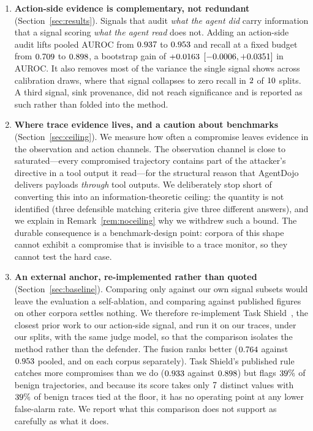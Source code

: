 \documentclass[pdflatex,sn-basic]{sn-jnl}%
\theoremstyle{thmstyleone}
\theoremstyle{thmstyletwo}
\theoremstyle{thmstylethree}
\begin{document}
\begin{enumerate}
\item \textbf{Action-side evidence is complementary, not redundant}
(Section~\ref{sec:results}). Signals that audit \emph{what the agent did} carry
information that a signal scoring \emph{what the agent read} does not. Adding
an action-side audit lifts pooled $\mathrm{AUROC}$ from $0.937$ to
$0.953$ and recall at a fixed budget from $0.709$ to
$0.898$, a bootstrap gain of $+0.0163$
$[-0.0006, +0.0351]$ in AUROC. It also removes most of the
variance the single signal shows across calibration draws, where that signal
collapses to zero recall in $2$ of $10$ splits. A third
signal, sink provenance, did not reach significance and is reported as such rather
than folded into the method.

\item \textbf{Where trace evidence lives, and a caution about benchmarks}
(Section~\ref{sec:ceiling}). We measure how often a compromise leaves evidence in
the observation and action channels. The observation channel is close to
saturated---every compromised trajectory contains part of the attacker's directive
in a tool output it read---for the structural reason that AgentDojo delivers
payloads \emph{through} tool outputs. We deliberately stop short of converting
this into an information-theoretic ceiling: the quantity is not identified (three
defensible matching criteria give three different answers), and we explain in
Remark~\ref{rem:noceiling} why we withdrew such a bound.
The durable consequence is a benchmark-design point: corpora of this
shape cannot exhibit a compromise that is invisible to a trace monitor, so they
cannot test the hard case.

\item \textbf{An external anchor, re-implemented rather than quoted}
(Section~\ref{sec:baseline}). Comparing only against our own signal subsets would
leave the evaluation a self-ablation, and comparing against published figures on
other corpora settles nothing. We therefore re-implement Task
Shield~\citep{jia2024taskshield}, the closest prior work to our action-side
signal, and run it on our traces, under our splits, with the same judge model, so
that the comparison isolates the method rather than the defender. The fusion ranks
better ($0.764$ against $0.953$ pooled, and on each corpus
separately). Task Shield's published rule catches more compromises than we do
($0.933$ against $0.898$) but flags $39\%$ of benign
trajectories, and because its score takes only $7$ distinct values
with $39\%$ of benign traces tied at the floor, it has no operating
point at any lower false-alarm rate. We report what this comparison does not
support as carefully as what it does.


\end{enumerate}
\end{document}
